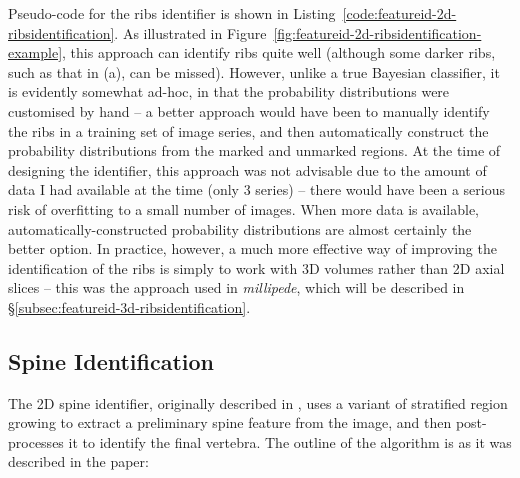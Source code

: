 Pseudo-code for the ribs identifier is shown in Listing~\ref{code:featureid-2d-ribsidentification}. As illustrated in Figure~\ref{fig:featureid-2d-ribsidentification-example}, this approach can identify ribs quite well (although some darker ribs, such as that in (a), can be missed). However, unlike a true Bayesian classifier, it is evidently somewhat ad-hoc, in that the probability distributions were customised by hand -- a better approach would have been to manually identify the ribs in a training set of image series, and then automatically construct the probability distributions from the marked and unmarked regions. At the time of designing the identifier, this approach was not advisable due to the amount of data I had available at the time (only $3$ series) -- there would have been a serious risk of overfitting to a small number of images. When more data is available, automatically-constructed probability distributions are almost certainly the better option. In practice, however, a much more effective way of improving the identification of the ribs is simply to work with 3D volumes rather than 2D axial slices -- this was the approach used in \emph{millipede}, which will be described in \S\ref{subsec:featureid-3d-ribsidentification}.


\newpage

\subsection{Spine Identification}
\label{subsec:featureid-2d-spine}


The 2D spine identifier, originally described in \cite{gvcispa09}, uses a variant of stratified region growing to extract a preliminary spine feature from the image, and then post-processes it to identify the final vertebra. The outline of the algorithm is as it was described in the paper:

